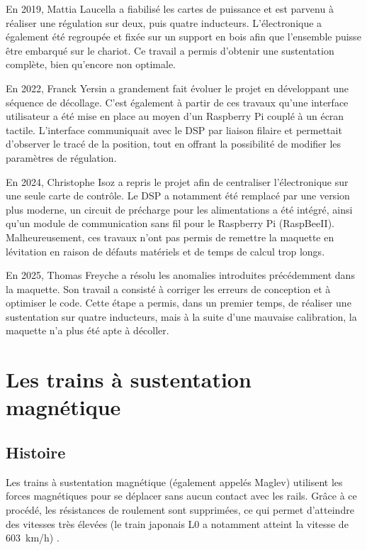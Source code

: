 En 2019, Mattia Laucella \cite{Laucella} a fiabilisé les cartes de puissance et est parvenu à réaliser une régulation sur deux, puis quatre inducteurs. L'électronique a également été regroupée et fixée sur un support en bois afin que l'ensemble puisse être embarqué sur le chariot. Ce travail a permis d'obtenir une sustentation complète, bien qu'encore non optimale.

En 2022, Franck Yersin \cite{Yersin} a grandement fait évoluer le projet en développant une séquence de décollage. C'est également à partir de ces travaux qu'une interface utilisateur a été mise en place au moyen d'un Raspberry Pi couplé à un écran tactile. L'interface communiquait avec le DSP par liaison filaire et permettait d'observer le tracé de la position, tout en offrant la possibilité de modifier les paramètres de régulation.

En 2024, Christophe Isoz \cite{Isoz} a repris le projet afin de centraliser l'électronique sur une seule carte de contrôle. Le DSP a notamment été remplacé par une version plus moderne, un circuit de précharge pour les alimentations a été intégré, ainsi qu'un module de communication sans fil pour le Raspberry Pi (RaspBeeII). Malheureusement, ces travaux n'ont pas permis de remettre la maquette en lévitation en raison de défauts matériels et de temps de calcul trop longs.

En 2025, Thomas Freyche \cite{Freyche} a résolu les anomalies introduites précédemment dans la maquette. Son travail a consisté à corriger les erreurs de conception et à optimiser le code. Cette étape a permis, dans un premier temps, de réaliser une sustentation sur quatre inducteurs, mais à la suite d'une mauvaise calibration, la maquette n'a plus été apte à décoller.

\section{Les trains à sustentation magnétique}

\subsection{Histoire}

Les trains à sustentation magnétique (également appelés Maglev) utilisent les forces magnétiques pour se déplacer sans aucun contact avec les rails. Grâce à ce procédé, les résistances de roulement sont supprimées, ce qui permet d'atteindre des vitesses très élevées (le train japonais L0 a notamment atteint la vitesse de 603~km/h) \cite{Maglev}.

